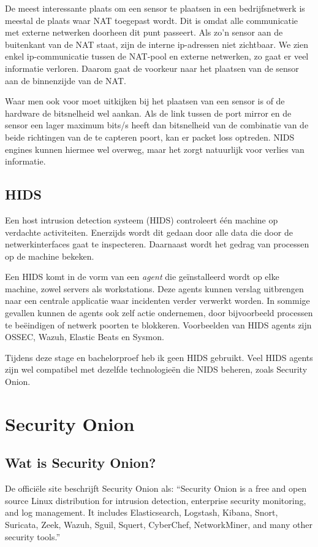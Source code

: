\documentclass[a4paper,12pt]{report}
\begin{document}
De meest interessante plaats om een sensor te plaatsen in een bedrijfsnetwerk is meestal de plaats waar NAT toegepast wordt.
Dit is omdat alle communicatie met externe netwerken doorheen dit punt passeert.
Als zo'n sensor aan de buitenkant van de NAT staat, zijn de interne ip-adressen niet zichtbaar.
We zien enkel ip-communicatie tussen de NAT-pool en externe netwerken, zo gaat er veel informatie verloren.
Daarom gaat de voorkeur naar het plaatsen van de sensor aan de binnenzijde van de NAT.

Waar men ook voor moet uitkijken bij het plaatsen van een sensor is of de hardware de bitsnelheid wel aankan.
Als de link tussen de port mirror en de sensor een lager maximum bits/s heeft dan bitsnelheid van de combinatie van de beide richtingen van de te capteren poort, kan er packet loss optreden.
NIDS engines kunnen hiermee wel overweg, maar het zorgt natuurlijk voor verlies van informatie.

\section{HIDS}
Een host intrusion detection systeem (HIDS) controleert één machine op verdachte activiteiten.
Enerzijds wordt dit gedaan door alle data die door de netwerkinterfaces gaat te inspecteren.
Daarnaast wordt het gedrag van processen op de machine bekeken.
\autocite{wikipedia:hids}

Een HIDS komt in de vorm van een \emph{agent} die geïnstalleerd wordt op elke machine, zowel servers als workstations.
Deze agents kunnen verslag uitbrengen naar een centrale applicatie waar incidenten verder verwerkt worden.
In sommige gevallen kunnen de agents ook zelf actie ondernemen, door bijvoorbeeld processen te beëindigen of netwerk poorten te blokkeren.
Voorbeelden van HIDS agents zijn OSSEC, Wazuh, Elastic Beats en Sysmon.

Tijdens deze stage en bachelorproef heb ik geen HIDS gebruikt.
Veel HIDS agents zijn wel compatibel met dezelfde technologieën die NIDS beheren, zoals Security Onion.

\chapter{Security Onion}
\section{Wat is Security Onion?}
De officiële site beschrijft Security Onion als:
``Security Onion is a free and open source Linux distribution for intrusion detection, enterprise security monitoring, and log management.
It includes Elasticsearch, Logstash, Kibana, Snort, Suricata, Zeek, Wazuh, Sguil, Squert, CyberChef, NetworkMiner, and many other security tools.''
\autocite{so:docs}
\end{document}
